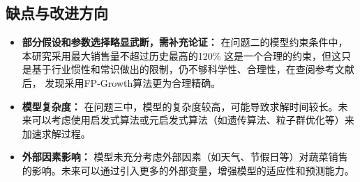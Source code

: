 \documentclass{article}
\begin{document}
\subsection{缺点与改进方向}
\begin{itemize}
    \item \textbf{部分假设和参数选择略显武断，需补充论证：} 在问题二的模型约束条件中，本研究采用最大销售量不超过历史最高的120\%  这是一个合理的约束，但这只是基于行业惯性和常识做出的限制，仍不够科学性、合理性，在查阅参考文献后，
    发现采用FP-Growth算法更为合理精确。

    \item \textbf{模型复杂度：} 在问题三中，模型的复杂度较高，可能导致求解时间较长。未来可以考虑使用启发式算法或元启发式算法（如遗传算法、粒子群优化等）来加速求解过程。

    \item \textbf{外部因素影响：} 模型未充分考虑外部因素（如天气、节假日等）对蔬菜销售的影响。未来可以通过引入更多的外部变量，增强模型的适应性和预测能力。
\end{itemize}
\end{document}
